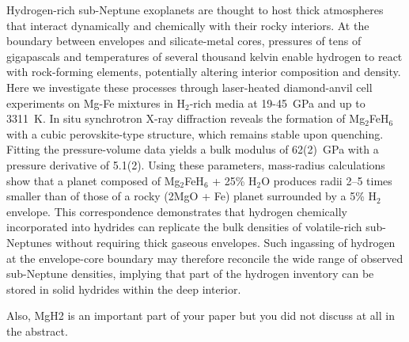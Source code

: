 \documentclass[draft,jgrga,12pt]{agujournal2019}
\begin{document}
Hydrogen-rich sub-Neptune exoplanets are thought to host thick atmospheres that interact dynamically and chemically with their rocky interiors. 
At the boundary between  envelopes and silicate-metal cores, pressures of tens of gigapascals and temperatures of several thousand kelvin enable hydrogen to react with rock-forming elements, potentially altering interior composition and density. 
Here we investigate these processes through laser-heated diamond-anvil cell experiments on Mg-Fe mixtures in H$_2$-rich media at 19-45~{GPa} and up to 3311~K\@.  
In situ synchrotron X-ray diffraction reveals the formation of Mg$_2$FeH$_6$ with a cubic perovskite-type structure, which remains stable upon quenching. 
Fitting the pressure-volume data yields a bulk modulus of 62(2)~{GPa} with a pressure derivative of 5.1(2). 
Using these parameters, mass-radius calculations show that a planet composed of Mg$_2$FeH$_6$ + 25\% H$_2$O produces radii 2--5 times smaller than of those of a rocky (2MgO + Fe) planet surrounded by a 5\% H$_2$ envelope. 
This correspondence demonstrates that hydrogen chemically incorporated into hydrides can replicate the bulk densities of volatile-rich sub-Neptunes without requiring thick gaseous envelopes. 
Such ingassing of hydrogen at the envelope-core boundary may therefore reconcile the wide range of observed sub-Neptune densities, implying that part of the hydrogen inventory can be stored in solid hydrides within the deep interior. 

\begin{cbox}
    Also, MgH2 is an important part of your paper but you did not discuss at all in the abstract.
\end{cbox}
\end{document}
